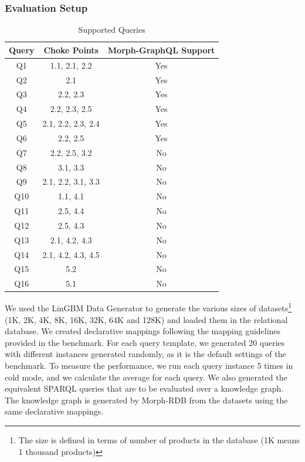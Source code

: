 \subsubsection{Evaluation Setup}
\begin{table}[h!]
 \centering
  \begin{tabular}{c | c | c} 
  \toprule
   Query & Choke Points & Morph-GraphQL Support  \\
 \midrule
  Q1 & 1.1, 2.1, 2.2 & Yes   \\ 
  Q2 & 2.1 & Yes  \\
  Q3 & 2.2, 2.3 & Yes   \\
  Q4 & 2.2, 2.3, 2.5 & Yes  \\
  Q5 & 2.1, 2.2, 2.3, 2.4 & Yes  \\ 
  Q6 & 2.2, 2.5 & Yes   \\ 
  Q7 & 2.2, 2.5, 3.2 & No    \\ 
  Q8 & 3.1, 3.3 & No    \\ 
  Q9 & 2.1, 2.2, 3.1, 3.3 & No    \\ 
  Q10 & 1.1, 4.1 & No   \\ 
  Q11 & 2.5, 4.4 & No   \\ 
  Q12 & 2.5, 4.3 & No   \\ 
  Q13 & 2.1, 4.2, 4.3 & No   \\ 
  Q14 & 2.1, 4.2, 4.3, 4.5 & No   \\ 
  Q15 & 5.2 & No   \\ 
  Q16 & 5.1 & No   \\ 
  \bottomrule
  \end{tabular}
  \caption{Supported Queries}
 \label{table:supported-queries}
 \end{table}
We used the LinGBM Data Generator to generate the various sizes of datasets\footnote{The size is defined in terms of number of products in the database (1K means 1 thousand products)} (1K, 2K, 4K, 8K, 16K, 32K, 64K and 128K) and loaded them in the relational database. We created declarative mappings following the mapping guidelines provided in the benchmark. For each query template, we generated 20 queries with different instances generated randomly, as it is the default settings of the benchmark. To measure the performance, we run each query instance 5 times in cold mode, and we calculate the average for each query. We also generated the equivalent SPARQL queries that are to be evaluated over a knowledge graph. The knowledge graph is generated by Morph-RDB \citep{priyatna2014formalisation} from the datasets using the same declarative mappings. 
